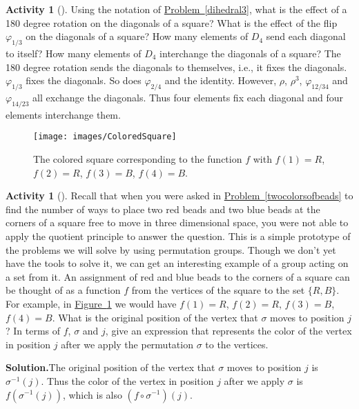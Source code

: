 \documentclass[10pt,]{book}
\theoremstyle{plain}
\theoremstyle{definition}
\newtheorem{activity}[project]{Activity}
\numberwithin{equation}{chapter}
\begin{document}
\begin{activity}[]\label{activity-282}
Using the notation of \hyperref[dihedral3]{Problem~\ref{dihedral3}}, what is the effect of a 180 degree rotation on the diagonals of a square? What is the effect of the flip \(\varphi_{1/3}\) on the diagonals of a square? How many elements of \(D_4\) send each diagonal to itself? How many elements of \(D_4\) interchange the diagonals of a square?%
The 180 degree rotation sends the diagonals to themselves, i.e., it fixes the diagonals. \(\varphi_{1/3}\) fixes the diagonals. So does \(\varphi_{2/4}\) and the identity. However, \(\rho\), \(\rho^3\), \(\varphi_{12/34}\) and \(\varphi_{14/23}\) all exchange the diagonals. Thus four elements fix each diagonal and four elements interchange them.%
\begin{figure}
\centering
\texttt{[image: images/ColoredSquare]}
\caption{The colored square corresponding to the function \(f\) with \(f(1) =R\), \(f(2)
= R\), \(f(3)=B\), \(f(4)=B\).\label{ColoredSquare}}
\end{figure}
\end{activity}
\begin{activity}[]\label{actiononfunctions}
Recall that when you were asked in \hyperref[twocolorsofbeads]{Problem~\ref{twocolorsofbeads}} to find the number of ways to place two red beads and two blue beads at the corners of a square free to move in three dimensional space, you were not able to apply the quotient principle to answer the question. This is a simple prototype of the problems we will solve by using permutation groups. Though we don't yet have the tools to solve it, we can get an interesting example of a group acting on a set from it. An assignment of red and blue beads to the corners of a square can be thought of as a function \(f\) from the vertices of the square to the set \(\{R,B\}\). For example, in \hyperref[ColoredSquare]{Figure~\ref{ColoredSquare}} we would have \(f(1) =R\), \(f(2)
= R\), \(f(3)=B\), \(f(4)=B\). What is the original position of the vertex that \(\sigma\) moves to position \(j\)? In terms of \(f\), \(\sigma\) and \(j\), give an expression that represents the color of the vertex in position \(j\) after we apply the permutation \(\sigma\) to the vertices.%
\par\medskip\noindent%
\textbf{Solution.}\quad The original position of the vertex that \(\sigma\) moves to position \(j\) is \(\sigma^{-1}(j)\). Thus the color of the vertex in position \(j\) after we apply \(\sigma\) is \(f(\sigma^{-1}(j))\), which is also \((f\circ
\sigma^{-1})(j)\).%
\end{activity}
\end{document}
